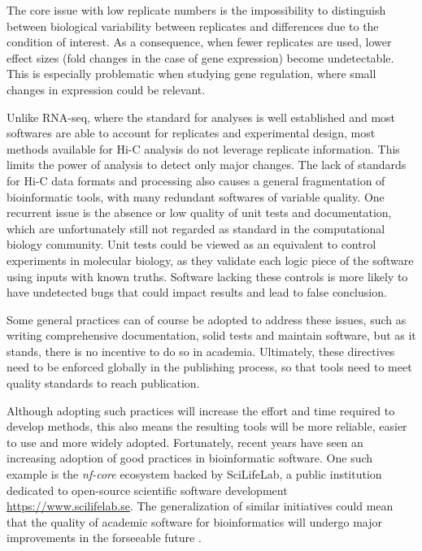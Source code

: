The core issue with low replicate numbers is the impossibility to distinguish between biological variability between replicates and differences due to the condition of interest. As a consequence, when fewer replicates are used, lower effect sizes (fold changes in the case of gene expression) become undetectable. This is especially problematic when studying gene regulation, where small changes in expression could be relevant.


Unlike RNA-seq, where the standard for analyses is well established and most softwares are able to account for replicates and experimental design, most methods available for Hi-C analysis do not leverage replicate information. This limits the power of analysis to detect only major changes. The lack of standards for Hi-C data formats and processing also causes a general fragmentation of bioinformatic tools, with many redundant softwares of variable quality. One recurrent issue is the absence or low quality of unit tests and documentation, which are unfortunately still not regarded as standard in the computational biology community. Unit tests could be viewed as an equivalent to control experiments in molecular biology, as they validate each logic piece of the software using inputs with known truths. Software lacking these controls is more likely to have undetected bugs that could impact results and lead to false conclusion.

Some general practices can of course be adopted to address these issues, such as writing comprehensive documentation, solid tests and maintain software, but as it stands, there is no incentive to do so in academia. Ultimately, these directives need to be enforced globally in the publishing process, so that tools need to meet quality standards to reach publication.

Although adopting such practices will increase the effort and time required to develop methods, this also means the resulting tools will be more reliable, easier to use and more widely adopted. Fortunately, recent years have seen an increasing adoption of good practices in bioinformatic software. One such example is the \textit{nf-core} ecosystem backed by SciLifeLab, a public institution dedicated to open-source scientific software development \url{https://www.scilifelab.se}. The generalization of similar initiatives could mean that the quality of academic software for bioinformatics will undergo major improvements in the forseeable future \cite{ewelsNfcoreFrameworkCommunitycurated2020}.